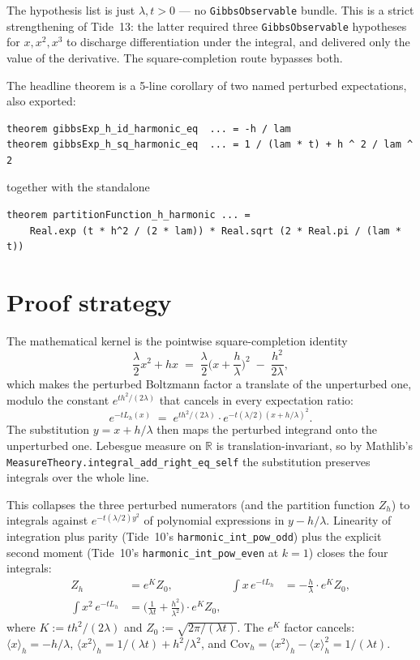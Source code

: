 \documentclass[11pt]{article}
\begin{document}
\noindent The hypothesis list is just $\lambda, t > 0$ — no
\texttt{GibbsObservable} bundle. This is a strict strengthening of
Tide~13: the latter required three \texttt{GibbsObservable} hypotheses
for $x, x^2, x^3$ to discharge differentiation under the integral, and
delivered only the value of the derivative. The square-completion
route bypasses both.

The headline theorem is a 5-line corollary of two named perturbed
expectations, also exported:
\begin{verbatim}
theorem gibbsExp_h_id_harmonic_eq  ... = -h / lam
theorem gibbsExp_h_sq_harmonic_eq  ... = 1 / (lam * t) + h ^ 2 / lam ^ 2
\end{verbatim}
together with the standalone
\begin{verbatim}
theorem partitionFunction_h_harmonic ... =
    Real.exp (t * h^2 / (2 * lam)) * Real.sqrt (2 * Real.pi / (lam * t))
\end{verbatim}

\section{Proof strategy}

The mathematical kernel is the pointwise square-completion identity
\[
  \frac{\lambda}{2} x^2 + h x \;=\;
  \frac{\lambda}{2}\Big(x + \frac{h}{\lambda}\Big)^2
   \;-\; \frac{h^2}{2\lambda},
\]
which makes the perturbed Boltzmann factor a translate of the
unperturbed one, modulo the constant $e^{th^2/(2\lambda)}$ that
cancels in every expectation ratio:
\[
  e^{-t L_h(x)}
  \;=\; e^{th^2/(2\lambda)} \cdot e^{-t (\lambda/2)(x + h/\lambda)^2}.
\]
The substitution $y = x + h/\lambda$ then maps the perturbed integrand
onto the unperturbed one. Lebesgue measure on $\mathbb{R}$ is
translation-invariant, so by Mathlib's
\texttt{MeasureTheory.integral\_add\_right\_eq\_self} the substitution
preserves integrals over the whole line.

This collapses the three perturbed numerators (and the partition
function $Z_h$) to integrals against $e^{-t(\lambda/2)y^2}$ of
polynomial expressions in $y - h/\lambda$. Linearity of integration
plus parity (Tide~10's \texttt{harmonic\_int\_pow\_odd}) plus the
explicit second moment (Tide~10's \texttt{harmonic\_int\_pow\_even} at
$k=1$) closes the four integrals:
\begin{align*}
  Z_h &= e^K Z_0, \quad &
  \int x\, e^{-t L_h} &= -\tfrac{h}{\lambda} \cdot e^K Z_0, \\
  \int x^2\, e^{-t L_h} &= \big(\tfrac{1}{\lambda t} + \tfrac{h^2}{\lambda^2}\big)\cdot e^K Z_0,
\end{align*}
where $K := th^2/(2\lambda)$ and $Z_0 := \sqrt{2\pi/(\lambda t)}$.
The $e^K$ factor cancels:
$\langle x \rangle_h = -h/\lambda$,
$\langle x^2 \rangle_h = 1/(\lambda t) + h^2/\lambda^2$, and
$\mathrm{Cov}_h = \langle x^2\rangle_h - \langle x \rangle_h^2 = 1/(\lambda t)$.
\end{document}
